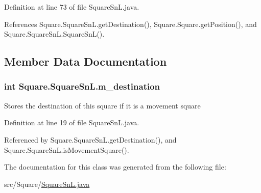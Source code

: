 Definition at line 73 of file Square\+Sn\+L.\+java.



References Square.\+Square\+Sn\+L.\+get\+Destination(), Square.\+Square.\+get\+Position(), and Square.\+Square\+Sn\+L.\+Square\+Sn\+L().



\subsection{Member Data Documentation}
\hypertarget{class_square_1_1_square_sn_l_a1906be8d7e5ea28a4b5b1585d820186f}{}
\subsubsection[{m\+\_\+destination}]{\setlength{\rightskip}{0pt plus 5cm}int Square.\+Square\+Sn\+L.\+m\+\_\+destination\hspace{0.3cm}{\ttfamily [private]}}\label{class_square_1_1_square_sn_l_a1906be8d7e5ea28a4b5b1585d820186f}
Stores the destination of this square if it is a movement square 

Definition at line 19 of file Square\+Sn\+L.\+java.



Referenced by Square.\+Square\+Sn\+L.\+get\+Destination(), and Square.\+Square\+Sn\+L.\+is\+Movement\+Square().



The documentation for this class was generated from the following file\+:\begin{DoxyCompactItemize}
\item 
src/\+Square/\hyperlink{_square_sn_l_8java}{Square\+Sn\+L.\+java}\end{DoxyCompactItemize}
